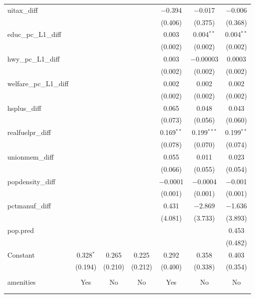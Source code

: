 \begin{table}[!htbp]
\begin{tabular}{@{\extracolsep{5pt}}lcccccc}
  uitax\_diff &  &  &  & $-$0.394 & $-$0.017 & $-$0.006 \\ 
  &  &  &  & (0.406) & (0.375) & (0.368) \\ 
  educ\_pc\_L1\_diff &  &  &  & 0.003 & 0.004$^{**}$ & 0.004$^{**}$ \\ 
  &  &  &  & (0.002) & (0.002) & (0.002) \\ 
  hwy\_pc\_L1\_diff &  &  &  & 0.003 & $-$0.00003 & 0.0003 \\ 
  &  &  &  & (0.002) & (0.002) & (0.002) \\ 
  welfare\_pc\_L1\_diff &  &  &  & 0.002 & 0.002 & 0.002 \\ 
  &  &  &  & (0.002) & (0.002) & (0.002) \\ 
  hsplus\_diff &  &  &  & 0.065 & 0.048 & 0.043 \\ 
  &  &  &  & (0.073) & (0.056) & (0.060) \\ 
  realfuelpr\_diff &  &  &  & 0.169$^{**}$ & 0.199$^{***}$ & 0.199$^{**}$ \\ 
  &  &  &  & (0.078) & (0.070) & (0.074) \\ 
  unionmem\_diff &  &  &  & 0.055 & 0.011 & 0.023 \\ 
  &  &  &  & (0.066) & (0.055) & (0.054) \\ 
  popdensity\_diff &  &  &  & $-$0.0001 & $-$0.0004 & $-$0.001 \\ 
  &  &  &  & (0.001) & (0.001) & (0.001) \\ 
  pctmanuf\_diff &  &  &  & 0.431 & $-$2.869 & $-$1.636 \\ 
  &  &  &  & (4.081) & (3.733) & (3.893) \\ 
  pop.pred &  &  &  &  &  & 0.453 \\ 
  &  &  &  &  &  & (0.482) \\ 
  Constant & 0.328$^{*}$ & 0.265 & 0.225 & 0.292 & 0.358 & 0.403 \\ 
  & (0.194) & (0.210) & (0.212) & (0.400) & (0.338) & (0.354) \\ 
 \hline \\[-1.8ex] 
amenities & Yes & No & No & Yes & No & No \\ 
\hline \\[-1.8ex] 
\hline 
\hline \\[-1.8ex] 
\end{tabular} 
\end{table} 
